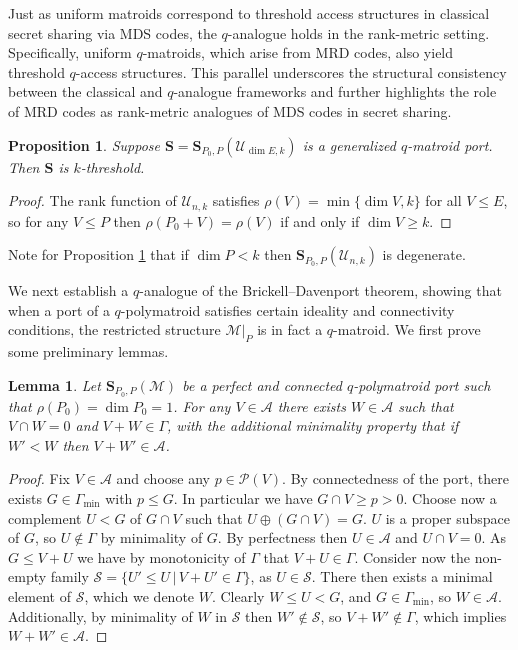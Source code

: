\documentclass[onecolumn,draftclsnofoot,12pt]{IEEEtran}
\newcommand{\A}{\mathcal{A}}
\renewcommand{\P}{\mathcal{P}}
\renewcommand{\S}{\mathbf{S}}
\newcommand{\M}{\mathcal{M}}
\theoremstyle{plain} %
\newtheorem{lemma}[theorem]{Lemma}
\newtheorem{proposition}[theorem]{Proposition}
\theoremstyle{definition}
\begin{document}
Just as uniform matroids correspond to threshold access structures in classical secret sharing via MDS codes, the $q$-analogue holds in the rank-metric setting. Specifically, uniform $q$-matroids, which arise from MRD codes, also yield threshold $q$-access structures. This parallel underscores the structural consistency between the classical and $q$-analogue frameworks and further highlights the role of MRD codes as rank-metric analogues of MDS codes in secret sharing.

\begin{proposition} Suppose $\S = \S_{P_0,P}(\mathcal{U}_{\dim E,k})$ is a generalized $q$-matroid port. Then $\S$ is $k$-threshold.\label{prop:uniform}
\end{proposition}
\begin{proof}
The rank function of $\mathcal{U}_{n,k}$ satisfies $\rho(V) = \min\{\dim V, k\}$ for all $V\leq E$, so for any $V\leq P$ then $\rho(P_0+V) = \rho(V)$ if and only if $\dim V \geq k$.
\end{proof}
Note for Proposition \ref{prop:uniform} that if $\dim P <k$ then $\S_{P_0,P}(\mathcal{U}_{n,k})$ is degenerate.

We next establish a $q$-analogue of the Brickell--Davenport theorem, showing that when a port of a $q$-polymatroid satisfies certain ideality and connectivity conditions, the restricted structure $\M|_P$ is in fact a $q$-matroid. We first prove some preliminary lemmas.

\begin{lemma} Let $\S_{P_0,P}(\mathcal{M})$ be a perfect and connected $q$-polymatroid port such that $\rho(P_0)= \dim P_0 = 1$. For any $V\in \A$ there exists $W\in \A$ such that $V\cap W=0$ and $V+W\in \Gamma$, with the additional minimality property that if $W'<W$ then $V+W'\in \A$.
\label{lem:brickell1}
\end{lemma}
\begin{proof}
Fix $V\in \A$ and choose any $p\in \P(V)$. By connectedness of the port, there exists $G\in \Gamma_{\min}$ with $p\leq G$. In particular we have $G\cap V \geq p>0$. Choose now a complement $U< G$ of $G\cap V$ such that $U\oplus (G\cap V) = G$. $U$ is a proper subspace of $G$, so $U\notin \Gamma$ by minimality of $G$. By perfectness then $U\in \A$ and $U\cap V = 0$. As $G\leq V+U$ we have by monotonicity of $\Gamma$ that $V+U\in \Gamma$. Consider now the non-empty family $\mathcal{S} = \{ U'\leq U\,|\, V+U'\in \Gamma\}$, as $U\in \mathcal{S}$. There then exists a minimal element of $\mathcal{S}$, which we denote $W$. Clearly $W\leq U<G$, and $G\in \Gamma_{\min}$, so $W\in \A$. Additionally, by minimality of $W$ in $\mathcal{S}$ then $W'\notin \mathcal{S}$, so $V+W'\notin \Gamma$, which implies $W+W'\in \A$.
\end{proof}
\end{document}
